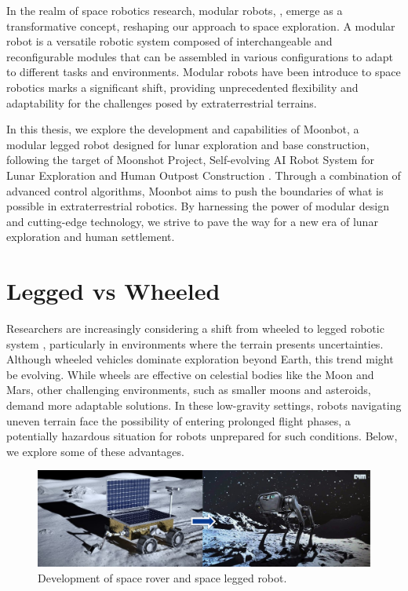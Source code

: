 In the realm of space robotics research, modular robots, \cite{modularity}, \cite{electrovoxel} emerge as a transformative concept, reshaping our approach to space exploration. A modular robot is a versatile robotic system composed of interchangeable and reconfigurable modules that can be assembled in various configurations to adapt to different tasks and environments. Modular robots have been introduce to space robotics \cite{worms} marks a significant shift, providing unprecedented flexibility and adaptability for the challenges posed by extraterrestrial terrains.

In this thesis, we explore the development and capabilities of Moonbot, a modular legged robot designed for lunar exploration and base construction, following the target of Moonshot Project, Self-evolving AI Robot System for Lunar Exploration and Human Outpost Construction \cite{moonshotGoal3B}. Through a combination of advanced control algorithms, Moonbot aims to push the boundaries of what is possible in extraterrestrial robotics. By harnessing the power of modular design and cutting-edge technology, we strive to pave the way for a new era of lunar exploration and human settlement.

\section{Legged vs Wheeled}
Researchers are increasingly considering a shift from wheeled to legged robotic system \cite{spacebok}, particularly in environments where the terrain presents uncertainties. Although wheeled vehicles dominate exploration beyond Earth, this trend might be evolving. While wheels are effective on celestial bodies like the Moon and Mars, other challenging environments, such as smaller moons and asteroids, demand more adaptable solutions. In these low-gravity settings, robots navigating uneven terrain face the possibility of entering prolonged flight phases, a potentially hazardous situation for robots unprepared for such conditions. Below, we explore some of these advantages.\\

\begin{figure}[h]
  \centering
  \includegraphics[width=150mm]{./fig/intro/leggedvswheeled.pdf}
  \vspace{2mm}
  \caption{Development of space rover and space legged robot.}\label{fig1}
\end{figure}

